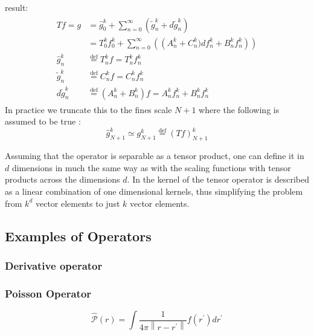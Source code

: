 \documentclass[../master_thesis.tex]{subfiles}
\begin{document}
result:
\begin{align}
  \begin{split}
    Tf = g &= \hat{g}^k_0 + \sum^\infty_{n=0}\left(\tilde{g}^k_n + d\tilde{g}^k_n\right)\\
       &= T^k_0f^k_0 +  \sum^\infty_{n=0}\left(\left(A_n^k + C_n^k)df^k_n + B^k_nf^k_n\right)\right)\\
       \hat{g}^k_n &\stackrel{\text{def}}{=} T^k_nf = T^k_nf^k_n\\
       \tilde{g}^k_n &\stackrel{\text{def}}{=} C^k_nf = C^k_nf^k_n\\
       d\tilde{g}^k_n &\stackrel{\text{def}}{=}\left(A^k_n + B^k_n\right)f = A^k_nf^k_n + B^k_nf^k_n
  \end{split}
\end{align}
In practice we truncate this to the fines scale $N+1$ where the following is assumed to be true \cite{Frediani:2013}:
\begin{equation}
  \hat{g}^k_{N+1} \simeq g^k_{N+1} \stackrel{\text{def}}{=} (Tf)^k_{N+1}
\end{equation}

Assuming that the operator is separable as a tensor product, one can define it in
$d$ dimensions in much the same way as with the scaling functions with tensor products
across the dimensions $d$. In \cite{Frediani:2013} the kernel of the tensor operator is
described as a linear combination of one dimensional kernels, thus simplifying the
problem from $k^d$ vector elements to just $k$ vector elements.
\subsection{Examples of Operators}
\subsubsection{Derivative operator}

\subsubsection{Poisson Operator}

\begin{equation}\label{eq:Poissonopmw}
\hat{\mathscr{P}}(r)=\int \frac{1}{4 \pi\left\|r-r^{\prime}\right\|} f\left(r^{\prime}\right)
d r^{\prime}
\end{equation}


\biblio
\end{document}
